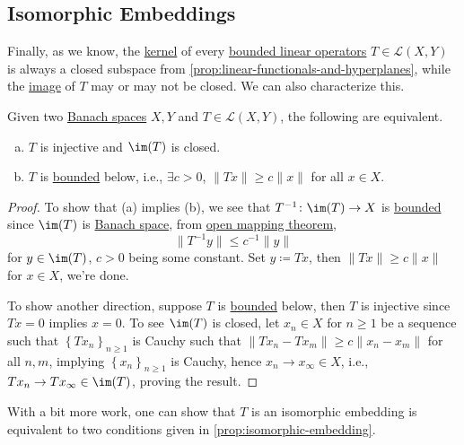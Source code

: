 \subsection{Isomorphic Embeddings}
Finally, as we know, the \hyperref[def:kernel]{kernel} of every \hyperref[def:bounded-linear-op]{bounded linear operators} \(T\in \mathcal{L} (X, Y)\) is always a closed subspace from \autoref{prop:linear-functionals-and-hyperplanes}, while the \hyperref[def:image]{image} of \(T\) may or may not be closed. We can also characterize this.

\begin{proposition}\label{prop:isomorphic-embedding}
	Given two \hyperref[def:Banach-space]{Banach spaces} \(X, Y\) and \(T\in \mathcal{L} (X, Y)\), the following are equivalent.
	\begin{enumerate}[(a)]
		\item \(T\) is injective and \(\im (T)\) is closed.
		\item \(T\) is \hyperref[rmk:bounded-op]{bounded} below, i.e., \(\exists c > 0\), \(\lVert Tx\rVert \geq c \lVert x\rVert \) for all \(x\in X\).
	\end{enumerate}
\end{proposition}
\begin{proof}
	To show that (a) implies (b), we see that \(T^{-1} \colon \im(T) \to X\) is \hyperref[rmk:bounded-op]{bounded}  since \(\im(T)\) is \hyperref[def:Banach-space]{Banach space}, from \hyperref[thm:open-mapping]{open mapping theorem},
	\[
		\lVert T^{-1} y\rVert \leq c^{-1} \lVert y\rVert
	\]
	for \(y\in \im(T)\), \(c > 0\) being some constant. Set \(y\coloneqq Tx\), then \(\lVert Tx\rVert \geq c\lVert x\rVert\) for \(x\in X\), we're done.

	To show another direction, suppose \(T\) is \hyperref[rmk:bounded-op]{bounded} below, then \(T\) is injective since \(Tx= 0\) implies \(x = 0\). To see \(\im(T)\) is closed, let \(x_{n} \in X\) for \(n\geq 1\) be a sequence such that \(\left\{ Tx_n \right\} _{n \geq 1}\) is Cauchy such that \(\lVert Tx_n - Tx_m\rVert \geq c \lVert x_n - x_m\rVert \) for all \(n, m\), implying \(\left\{ x_n \right\} _{n\geq 1}\)  is Cauchy, hence \(x_n \to x_\infty \in X\), i.e., \(Tx_n \to Tx_\infty \in \im(T)\), proving the result.
\end{proof}

\begin{remark}
	With a bit more work, one can show that \(T\) is an isomorphic embedding is equivalent to two conditions given in \autoref{prop:isomorphic-embedding}.
\end{remark}

